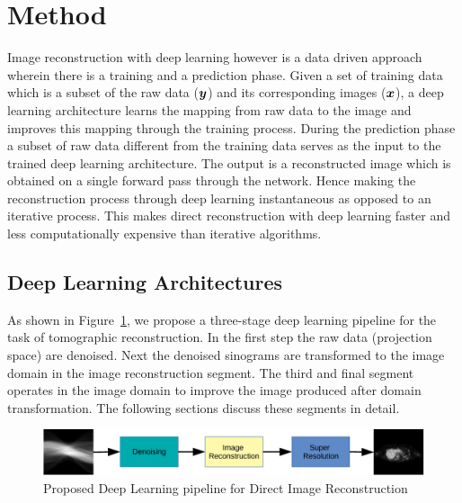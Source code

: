 \section{Method}

Image reconstruction with deep learning however is a data driven approach wherein there is a training and a prediction phase. Given a set of training data which is a subset of the raw data ($\bm{y}$) and its corresponding images ($\bm{x}$), a deep learning architecture learns the mapping from raw data to the image and improves this mapping through the training process. During the prediction phase a subset of raw data different from the training data serves as the input to the trained deep learning architecture. The output is a reconstructed image which is obtained on a single forward pass through the network. Hence making the reconstruction process through deep learning instantaneous as opposed to an iterative process. This makes direct reconstruction with deep learning faster and less computationally expensive than iterative algorithms.

\subsection{Deep Learning Architectures}

As shown in Figure~\ref{fig:approach}, we propose a three-stage deep learning pipeline for the task of tomographic reconstruction. In the first step the raw data (projection space) are denoised. Next the denoised sinograms are transformed to the image domain in the image reconstruction segment. The third and final segment operates in the image domain to improve the image produced after domain transformation. The following sections discuss these segments in detail.

\begin{figure}[!htbp]
	\centering
	\includegraphics[width=0.99\linewidth]{./Figures/three-step-crop.pdf}
	\caption{Proposed Deep Learning pipeline for Direct Image Reconstruction}
	\label{fig:approach}
\end{figure}


